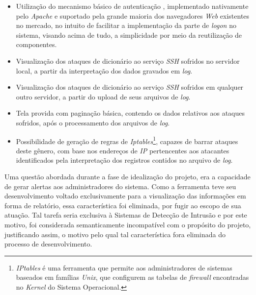 \begin{itemize}
    \item Utilização do mecanismo básico de autenticação \cite{BasicAuth}, implementado nativamente pelo \textit{Apache} e suportado pela grande maioria dos navegadores \textit{Web} existentes no mercado, no intuito de facilitar a implementação da parte de \textit{logon} no sistema, visando acima de tudo, a simplicidade por meio da reutilização de componentes.

    \item Visualização dos ataques de dicionário ao serviço \textit{SSH} sofridos no servidor local, a partir da interpretação dos dados gravados em \textit{log}.

    \item Visualização dos ataques de dicionário ao serviço \textit{SSH} sofridos em qualquer outro servidor, a partir do upload de seus arquivos de \textit{log}.

    \item Tela provida com paginação básica, contendo os dados relativos aos ataques sofridos, após o processamento dos arquivos de \textit{log}.

    \item Possibilidade de geração de regras de \textit{Iptables}\footnote{\textit{IPtables} é uma ferramenta que permite aos administradores de sistemas baseados em famílias \textit{Unix}, que configurem as tabelas de \textit{firewall} encontradas no \textit{Kernel} do Sistema Operacional.}, capazes de barrar ataques deste gênero, com base nos endereços de \textit{IP} pertencentes aos atacantes identificados pela interpretação dos registros contidos no arquivo de \textit{log}.
\end{itemize}

Uma questão abordada durante a fase de idealização do projeto, era a capacidade de gerar alertas aos administradores do sistema. Como a ferramenta teve seu desenvolvimento voltado exclusivamente para a visualização das informações em forma de relatório, essa característica foi eliminada, por fugir ao escopo de sua atuação. Tal tarefa seria exclusiva à Sistemas de Detecção de Intrusão e por este motivo, foi considerada semanticamente incompatível com o propósito do projeto, justificando assim, o motivo pelo qual tal característica fora eliminada do processo de desenvolvimento.
